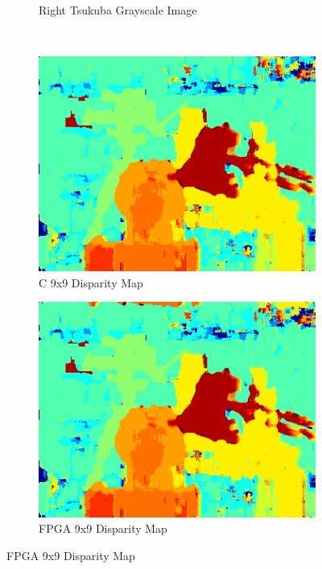 \begin{figure}
\begin{center}
\begin{subfigure}{0.45\textwidth}
		\caption{Right Tsukuba Grayscale Image}
		\label{fig:tsukubaR}
	\end{subfigure}
	\\
	\begin{subfigure}{0.45\textwidth}
		\includegraphics[width=\textwidth]{figures/tsukuba_c_9x9.png}
		\caption{C 9x9 Disparity Map}
		\label{fig:tsukubaC9x9}
	\end{subfigure}
	\begin{subfigure}{0.45\textwidth}
		\includegraphics[width=\textwidth]{figures/tsukuba_9x9_fpga.png}
		\caption{FPGA 9x9 Disparity Map}
		\label{fig:tsukubaFPGA9x9}
	\end{subfigure}

\end{center}
\end{figure}

